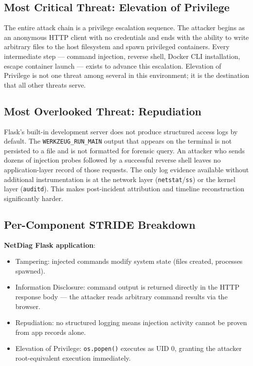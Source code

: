 \subsection{Most Critical Threat: Elevation of Privilege}

The entire attack chain is a privilege escalation sequence. The attacker begins as an anonymous HTTP client with no credentials and ends with the ability to write arbitrary files to the host filesystem and spawn privileged containers. Every intermediate step --- command injection, reverse shell, Docker CLI installation, escape container launch --- exists to advance this escalation. Elevation of Privilege is not one threat among several in this environment; it is the destination that all other threats serve.

\subsection{Most Overlooked Threat: Repudiation}

Flask's built-in development server does not produce structured access logs by default. The \texttt{WERKZEUG\_RUN\_MAIN} output that appears on the terminal is not persisted to a file and is not formatted for forensic query. An attacker who sends dozens of injection probes followed by a successful reverse shell leaves no application-layer record of those requests. The only log evidence available without additional instrumentation is at the network layer (\texttt{netstat}/\texttt{ss}) or the kernel layer (\texttt{auditd}). This makes post-incident attribution and timeline reconstruction significantly harder.

\subsection{Per-Component STRIDE Breakdown}

\textbf{NetDiag Flask application}:
\begin{itemize}
    \item Tampering: injected commands modify system state (files created, processes spawned).
    \item Information Disclosure: command output is returned directly in the HTTP response body --- the attacker reads arbitrary command results via the browser.
    \item Repudiation: no structured logging means injection activity cannot be proven from app records alone.
    \item Elevation of Privilege: \texttt{os.popen()} executes as UID 0, granting the attacker root-equivalent execution immediately.
\end{itemize}

